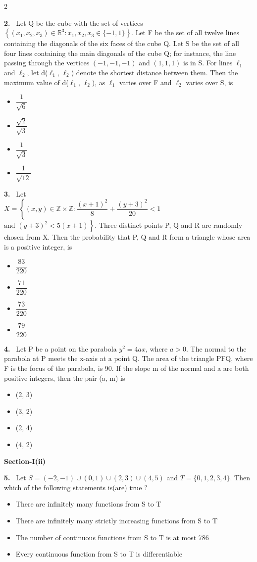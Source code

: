 \documentclass[10pt]{extarticle}
\newcommand{\sect}[1]{\par\smallskip\noindent\textbf{#1}\par}
\newcommand{\qn}[1]{\par\smallskip\noindent\textbf{#1.}~}
\newenvironment{qoptions}{\begin{itemize}[leftmargin=1.8em,itemsep=1pt,topsep=2pt,label={}]}{\end{itemize}}
\newcommand{\opt}[2]{\item[(#1)] #2}
\begin{document}
\begin{multicols}{2}
\qn{2} Let Q be the cube with the set of vertices $\left\{(x_1,x_2,x_3)\in\mathbb R^3:x_1,x_2,x_3\in\{-1,1\}\right\}$. Let F be the set of all twelve lines containing the diagonals of the six faces of the cube Q. Let S be the set of all four lines containing the main diagonals of the cube Q; for instance, the line passing through the vertices $(-1,-1,-1)$ and $(1,1,1)$ is in S. For lines $\ell_1$ and $\ell_2$, let d($\ell_1$, $\ell_2$) denote the shortest distance between them. Then the maximum value of d($\ell_1$, $\ell_2$), as $\ell_1$ varies over F and $\ell_2$ varies over S, is
\begin{qoptions}
\opt{A}{$\dfrac1{\sqrt6}$}
\opt{B}{$\dfrac{\sqrt2}{\sqrt3}$}
\opt{C}{$\dfrac1{\sqrt3}$}
\opt{D}{$\dfrac1{\sqrt{12}}$}
\end{qoptions}

\qn{3} Let\\ $X=\left\{(x,y)\in\mathbb Z\times\mathbb Z:\dfrac{(x+1)^2}8+\dfrac{(y+3)^2}{20}<1\right.$\\ $\left.\text{and }(y+3)^2<5(x+1)\right\}$. Three distinct points P, Q and R are randomly chosen from X. Then the probability that P, Q and R form a triangle whose area is a positive integer, is
\begin{qoptions}
\opt{A}{$\dfrac{83}{220}$}
\opt{B}{$\dfrac{71}{220}$}
\opt{C}{$\dfrac{73}{220}$}
\opt{D}{$\dfrac{79}{220}$}
\end{qoptions}

\qn{4} Let P be a point on the parabola $y^2=4ax$, where $a>0$. The normal to the parabola at P meets the x-axis at a point Q. The area of the triangle PFQ, where F is the focus of the parabola, is 90. If the slope m of the normal and a are both positive integers, then the pair (a, m) is
\begin{qoptions}
\opt{A}{(2, 3)}
\opt{B}{(3, 2)}
\opt{C}{(2, 4)}
\opt{D}{(4, 2)}
\end{qoptions}

\sect{Section-I(ii)}

\qn{5} Let $S=(-2,-1)\cup(0,1)\cup(2,3)\cup(4,5)$ and $T=\{0,1,2,3,4\}$. Then which of the following statements is(are) true ?
\begin{qoptions}
\opt{A}{There are infinitely many functions from S to T}
\opt{B}{There are infinitely many strictly increasing functions from S to T}
\opt{C}{The number of continuous functions from S to T is at most 786}
\opt{D}{Every continuous function from S to T is differentiable}
\end{qoptions}


\end{multicols}
\end{document}
